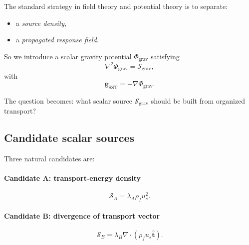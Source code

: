 \documentclass[11pt]{article}
\newcommand{\rhoF}{\rho_{\!f}}
\newcommand{\SST}{\mathrm{SST}}
\newcommand{\grav}{\mathrm{grav}}
\begin{document}
        The standard strategy in field theory and potential theory is to separate:
        \begin{itemize}
            \item a \emph{source density},
            \item a \emph{propagated response field}.
        \end{itemize}
        So we introduce a scalar gravity potential \(\Phi_{\grav}\) satisfying
        \begin{equation}
            \boxed{
                \nabla^2 \Phi_{\grav} = \mathcal{S}_{\grav},
            }
            \label{eq:poisson-general}
        \end{equation}
        with
        \begin{equation}
            \boxed{
                \mathbf{g}_{\SST}=-\nabla \Phi_{\grav}.
            }
            \label{eq:g-from-phi}
        \end{equation}
        
        The question becomes: what scalar source \(\mathcal{S}_{\grav}\) should be built from organized transport?
        
        \subsection{Candidate scalar sources}
            
            Three natural candidates are:
            
            \paragraph{Candidate A: transport-energy density}
                \begin{equation}
                    \mathcal{S}_A = \lambda_A \rhoF u_s^2.
                    \label{eq:SA}
                \end{equation}
            
            \paragraph{Candidate B: divergence of transport vector}
                \begin{equation}
                    \mathcal{S}_B = \lambda_B \nabla\cdot (\rhoF u_s \hat{\mathbf t}).
                    \label{eq:SB}
                \end{equation}
            
\end{document}
